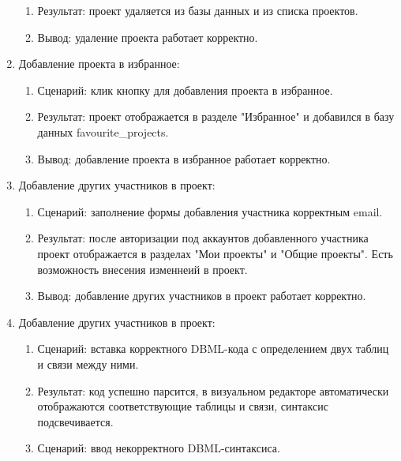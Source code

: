 \begin{enumerate}
\begin{enumerate}
     \item Результат: проект удаляется из базы данных и из списка проектов.

     \item Вывод: удаление проекта работает корректно.

    \end{enumerate}

\item Добавление проекта в избранное:
    \begin{enumerate}
     \item Сценарий: клик кнопку для добавления проекта в избранное.
     
     \item Результат: проект отображается в разделе "Избранное" и добавился в базу данных favourite\_projects.

     \item Вывод: добавление проекта в избранное работает корректно.

    \end{enumerate}

\item Добавление других участников в проект:
    \begin{enumerate}
     \item Сценарий: заполнение формы добавления участника корректным email.
     
     \item Результат: после авторизации под аккаунтов добавленного участника проект отображается в разделах "Мои проекты" и "Общие проекты". Есть возможность внесения изменнеий в проект.

     \item Вывод: добавление других участников в проект работает корректно.

    \end{enumerate}

\item Добавление других участников в проект:
    \begin{enumerate}
    \item Сценарий: вставка корректного DBML-кода с определением двух таблиц и связи между ними.
    
    \item Результат: код успешно парсится, в визуальном редакторе автоматически отображаются соответствующие таблицы и связи, синтаксис подсвечивается.
    
    \item Сценарий: ввод некорректного DBML-синтаксиса.
    

\end{enumerate}
\end{enumerate}
